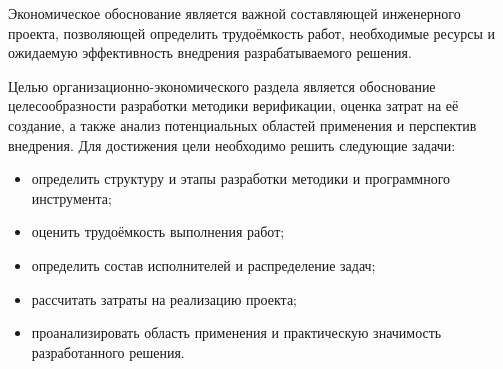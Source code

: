 
Экономическое обоснование является важной составляющей инженерного проекта,
позволяющей определить трудоёмкость работ, необходимые ресурсы и ожидаемую
эффективность внедрения разрабатываемого решения.

Целью организационно-экономического раздела является обоснование
целесообразности разработки методики верификации, оценка затрат на её
создание, а также анализ потенциальных областей применения и
перспектив внедрения. Для достижения цели необходимо решить следующие задачи:

\begin{itemize}
    \item определить структуру и этапы разработки методики и
    программного инструмента;
    \item оценить трудоёмкость выполнения работ;
    \item определить состав исполнителей и распределение задач;
    \item рассчитать затраты на реализацию проекта;
    \item проанализировать область применения и практическую
    значимость разработанного решения.
\end{itemize}
